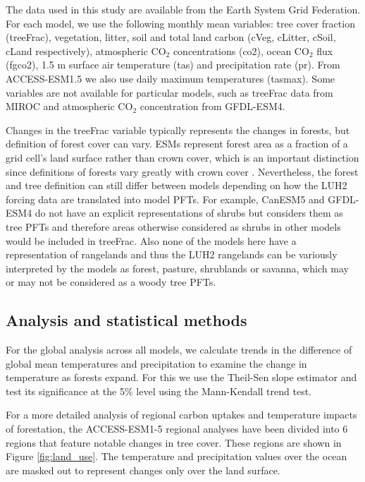 \documentclass[draft]{agujournal2019}
\begin{document}
The data used in this study are available from the Earth System Grid Federation.
For each model, we use the following monthly mean variables: tree cover fraction (treeFrac), vegetation, litter, soil and total land carbon (cVeg, cLitter, cSoil, cLand respectively), atmospheric CO$_2$ concentrations (co2), ocean CO$_2$ flux (fgco2), 1.5 m surface air temperature (tas) and precipitation rate (pr).
From ACCESS-ESM1.5 we also use daily maximum temperatures (tasmax).
Some variables are not available for particular models, such as treeFrac data from MIROC and atmospheric CO$_2$ concentration from GFDL-ESM4.

Changes in the treeFrac variable typically represents the changes in forests, but definition of forest cover can vary.
ESMs represent forest area as a fraction of a grid cell's land surface rather than crown cover, which is an important distinction since definitions of forests vary greatly with crown cover \cite{zomer_land_2008}.
Nevertheless, the forest and tree definition can still differ between models depending on how the LUH2 forcing data are translated into model PFTs.
For example, CanESM5 and GFDL-ESM4 do not have an explicit representations of shrubs but considers them as tree PFTs and therefore areas otherwise considered as shrubs in other models would be included in treeFrac.
Also none of the models here have a representation of rangelands and thus the LUH2 rangelands can be variously interpreted by the models as forest, pasture, shrublands or savanna, which may or may not be considered as a woody tree PFTs.

\subsection{Analysis and statistical methods}

For the global analysis across all models, we calculate trends in the difference of global mean temperatures and precipitation to examine the change in temperature as forests expand.
For this we use the Theil-Sen slope estimator and test its significance at the 5\% level using the Mann-Kendall trend test.

For a more detailed analysis of regional carbon uptakes and temperature impacts of forestation, the ACCESS-ESM1-5 regional analyses have been divided into 6 regions that feature notable changes in tree cover.
These regions are shown in Figure \ref{fig:land_use}.
The temperature and precipitation values over the ocean are masked out to represent changes only over the land surface.
\end{document}
